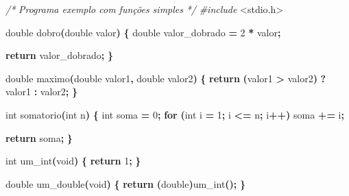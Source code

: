 \documentclass[
  11pt,
  a4paper,
]{scrbook}
\newenvironment{Shaded}{\begin{snugshade}}{\end{snugshade}}
\newcommand{\CommentTok}[1]{\textcolor[rgb]{0.56,0.35,0.01}{\textit{#1}}}
\newcommand{\ControlFlowTok}[1]{\textcolor[rgb]{0.13,0.29,0.53}{\textbf{#1}}}
\newcommand{\DataTypeTok}[1]{\textcolor[rgb]{0.13,0.29,0.53}{#1}}
\newcommand{\DecValTok}[1]{\textcolor[rgb]{0.00,0.00,0.81}{#1}}
\newcommand{\ImportTok}[1]{#1}
\newcommand{\NormalTok}[1]{#1}
\newcommand{\OperatorTok}[1]{\textcolor[rgb]{0.81,0.36,0.00}{\textbf{#1}}}
\newcommand{\PreprocessorTok}[1]{\textcolor[rgb]{0.56,0.35,0.01}{\textit{#1}}}
\begin{document}
\begin{Shaded}
\begin{Highlighting}[numbers=left,,]
\CommentTok{/*}
\CommentTok{Programa exemplo com funções simples}
\CommentTok{*/}
\PreprocessorTok{\#include }\ImportTok{\textless{}stdio.h\textgreater{}}

\DataTypeTok{double}\NormalTok{ dobro}\OperatorTok{(}\DataTypeTok{double}\NormalTok{ valor}\OperatorTok{)} \OperatorTok{\{}
    \DataTypeTok{double}\NormalTok{ valor\_dobrado }\OperatorTok{=} \DecValTok{2} \OperatorTok{*}\NormalTok{ valor}\OperatorTok{;}

    \ControlFlowTok{return}\NormalTok{ valor\_dobrado}\OperatorTok{;}
\OperatorTok{\}}

\DataTypeTok{double}\NormalTok{ maximo}\OperatorTok{(}\DataTypeTok{double}\NormalTok{ valor1}\OperatorTok{,} \DataTypeTok{double}\NormalTok{ valor2}\OperatorTok{)} \OperatorTok{\{}
    \ControlFlowTok{return} \OperatorTok{(}\NormalTok{valor1 }\OperatorTok{\textgreater{}}\NormalTok{ valor2}\OperatorTok{)} \OperatorTok{?}\NormalTok{ valor1 }\OperatorTok{:}\NormalTok{ valor2}\OperatorTok{;}
\OperatorTok{\}}

\DataTypeTok{int}\NormalTok{ somatorio}\OperatorTok{(}\DataTypeTok{int}\NormalTok{ n}\OperatorTok{)} \OperatorTok{\{}
    \DataTypeTok{int}\NormalTok{ soma }\OperatorTok{=} \DecValTok{0}\OperatorTok{;}
    \ControlFlowTok{for} \OperatorTok{(}\DataTypeTok{int}\NormalTok{ i }\OperatorTok{=} \DecValTok{1}\OperatorTok{;}\NormalTok{ i }\OperatorTok{\textless{}=}\NormalTok{ n}\OperatorTok{;}\NormalTok{ i}\OperatorTok{++)}
\NormalTok{        soma }\OperatorTok{+=}\NormalTok{ i}\OperatorTok{;}

    \ControlFlowTok{return}\NormalTok{ soma}\OperatorTok{;}
\OperatorTok{\}}

\DataTypeTok{int}\NormalTok{ um\_int}\OperatorTok{(}\DataTypeTok{void}\OperatorTok{)} \OperatorTok{\{}
    \ControlFlowTok{return} \DecValTok{1}\OperatorTok{;}
\OperatorTok{\}}

\DataTypeTok{double}\NormalTok{ um\_double}\OperatorTok{(}\DataTypeTok{void}\OperatorTok{)} \OperatorTok{\{}
    \ControlFlowTok{return} \OperatorTok{(}\DataTypeTok{double}\OperatorTok{)}\NormalTok{um\_int}\OperatorTok{();}
\OperatorTok{\}}


\end{Highlighting}
\end{Shaded}
\end{document}
